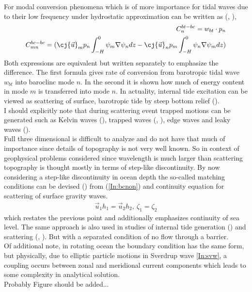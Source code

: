 For modal conversion phenomena which is of more importance for tidal waves due to their low frequency under hydrostatic approximation can be written as (\cite{griffiths2007internal}, \cite{kelly2012cascade}), 
\begin{align}
C_{n}^{bt-bc} = w_{bt} \cdot p_n\\
C_{mn}^{bc-bc} = (\cj{\vec{u}}_m p_n \int_{-H}^0 \psi_m \nabla \psi_n dz - \cj{\vec{u}}_n p_m \int_{-H}^0 \psi_n \nabla \psi_m dz)
\end{align}
Both expressions are equivalent but written separately to emphasize the difference. The first formula gives rate of conversion from barotropic tidal wave $w_{bt}$ into baroclinc mode $n$. In the second it is shown how much of energy content in mode $m$ is transferred into mode $n$.  In actuality, internal tide excitation can be viewed as scattering of surface, barotropic tide by steep bottom relief (\cite{hendershott1981long}).\\
I should explicitly note that during scattering event trapped motions can be generated such as Kelvin waves (\cite{pinsent1972kelvin}), trapped waves (\cite{longuet1967trapping}, \cite{kowalik2002tidal}), edge waves and leaky waves (\cite{leblond1978preface}).\\
Full three dimensional is difficult to analyze and do not have that much of importance since details of topography is not very well known. So in context of geophysical problems considered since wavelength is much larger than scattering topography is thought mostly in terms of step-like discontinuity. By now considering a step-like discontinuity in ocean depth the so-called matching conditions can be devised (\cite{mei1989theory}) from (\ref{In:bcnon}) and continuity equation for scattering of surface gravity waves.
\begin{align*}
\vec{u}_1 h_1 = \vec{u}_2 h_2,~\zeta_1 = \zeta_2
\end{align*}
which restates the previous point and additionally emphasizes continuity of sea level. The same approach is also used in studies of internal tide generation (\cite{st2002role}) and scattering (\cite{larsen1969internal}, \cite{chapman1981scattering}). But with a separated condition of no flow through a barrier.\\
Of additional note, in rotating ocean the boundary condition has the same form, but physically, due to elliptic particle motions in Sverdrup wave \eqref{In:svw}, a coupling occurs between zonal and meridional current components \cite{greenspan1968theory} which leads to some complexity in analytical solution.\\
Probably Figure should be added...

